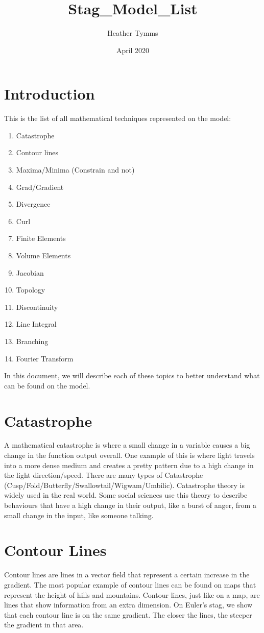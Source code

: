 \documentclass{article}
\title{Stag_Model_List}
\author{Heather Tymms}
\date{April 2020}
\begin{document}
\section{Introduction}
This is the list of all mathematical techniques represented on the model:
\begin{enumerate}
    \item{Catastrophe}
    \item{Contour lines}
    \item{Maxima/Minima (Constrain and not)}
    \item{Grad/Gradient}
    \item{Divergence}
    \item{Curl}
    \item{Finite Elements}
    \item{Volume Elements}
    \item{Jacobian}
    \item{Topology}
    \item{Discontinuity}
    \item{Line Integral}
    \item{Branching}
    \item{Fourier Transform}
\end{enumerate}

In this document, we will describe each of these topics to better understand what can be found on the model.


\section{Catastrophe}
A mathematical catastrophe is where a small change in a variable causes a big change in the function output overall. 
One example of this is where light travels into a more dense medium and creates a pretty pattern due to a high change in the light direction/speed.
There are many types of Catastrophe (Cusp/Fold/Butterfly/Swallowtail/Wigwam/Umbilic).
Catastrophe theory is widely used in the real world. Some social sciences use this theory to describe behaviours that have a high change in their output, like a burst of anger, from a small change in the input, like someone talking.


\section{Contour Lines}
Contour lines are lines in a vector field that represent a certain increase in the gradient. The most popular example of contour lines can be found on maps that represent the height of hills and mountains.
Contour lines, just like on a map, are lines that show information from an extra dimension. On Euler's stag, we show that each contour line is on the same gradient. The closer the lines, the steeper the gradient in that area.
\end{document}

